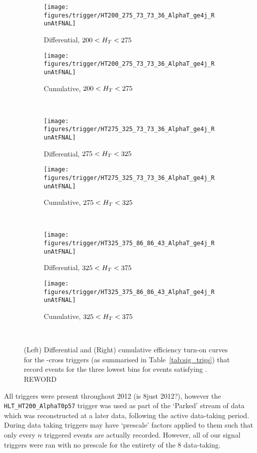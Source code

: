 \begin{figure}[!ht]
  \centering
    
    \begin{subfigure}[b]{0.48\textwidth}
      \texttt{[image: figures/trigger/HT200\_275\_73\_73\_36\_AlphaT\_ge4j\_RunAtFNAL]}
      \caption{Differential, $200 < H_T < 275 $\gev}
    \end{subfigure}
    \begin{subfigure}[b]{0.48\textwidth}
      \texttt{[image: figures/trigger/HT200\_275\_73\_73\_36\_AlphaT\_ge4j\_RunAtFNAL]}
      \caption{Cumulative, $200 < H_T < 275 $\gev}
    \end{subfigure} \\
    \begin{subfigure}[b]{0.48\textwidth}
      \texttt{[image: figures/trigger/HT275\_325\_73\_73\_36\_AlphaT\_ge4j\_RunAtFNAL]}
      \caption{Differential, $275 < H_T < 325 $\gev}
    \end{subfigure}
    \begin{subfigure}[b]{0.48\textwidth}
      \texttt{[image: figures/trigger/HT275\_325\_73\_73\_36\_AlphaT\_ge4j\_RunAtFNAL]}
      \caption{Cumulative, $275 < H_T < 325 $\gev}
    \end{subfigure} \\
    \begin{subfigure}[b]{0.48\textwidth}
      \texttt{[image: figures/trigger/HT325\_375\_86\_86\_43\_AlphaT\_ge4j\_RunAtFNAL]}
      \caption{Differential, $325 < H_T < 375 $\gev}
    \end{subfigure}
    \begin{subfigure}[b]{0.48\textwidth}
      \texttt{[image: figures/trigger/HT325\_375\_86\_86\_43\_AlphaT\_ge4j\_RunAtFNAL]}
      \caption{Cumulative, $325 < H_T < 375 $\gev}
    \end{subfigure} \\
  
    \caption{\label{fig:eff_alphat_ge4j}
      (Left) Differential and (Right) cumulative efficiency turn-on
      curves for the \HT-\alphat cross triggers (as summarised in
      Table~\ref{tab:sig_trigs}) that record events for the
      three lowest \HT bins  for events satisfying \njhigh. REWORD
    }
\end{figure}

All triggers were present throughout 2012 (is 8\tev just 2012?), however the 
\\\verb!HLT_HT200_AlphaT0p57! trigger was used as part of the `Parked' stream of 
data which was reconstructed at a later data, following the active data-taking 
period. During data taking triggers may have `prescale' factors applied to them 
such that only every $n$ triggered events are actually recorded. However, all of
our signal triggers were ran with no prescale for the entirety of the 8\tev
data-taking.




